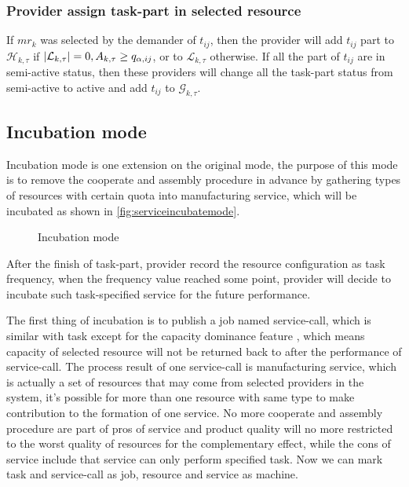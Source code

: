 \subsubsection{Provider assign task-part in selected resource} %
\label{subs:assign_in_select_resource}
If $mr_k$ was selected by the demander of $t_{ij}$, then the provider will add $t_{ij}$ part to $\mathcal{H}_{k,\tau}$ if $\left|\mathcal{L}_{k,\tau}\right|=0,A_{k,\tau}\ge q_{\alpha,ij}$, or to  $\mathcal{L}_{k,\tau}$ otherwise.
If all the part of $t_{ij}$ are in semi-active status, then these providers will change all the task-part status from semi-active to active and add $t_{ij}$ to $\mathcal{G}_{k,\tau}$.

\subsection{Incubation mode} %
\label{sub:incubation_mode}
Incubation mode is one extension on the original mode, the purpose of this mode is to remove the cooperate and assembly procedure in advance by gathering types of resources with certain quota into manufacturing service, which will be incubated as shown in \autoref{fig:serviceincubatemode}.  
\begin{figure}[htbp]
    \centering
    \resizebox{0.7\textwidth}{!}{}
    \caption{Incubation mode}
    \label{fig:serviceincubatemode}
\end{figure}
After the finish of task-part, provider record the resource configuration as task frequency, when the frequency value reached some point, provider will decide to incubate such task-specified service for the future performance.

The first thing of incubation is to publish a job named service-call, which is similar with task except for the capacity dominance feature , which means capacity of selected resource will not be returned back to after the performance of service-call. The process result of one service-call is manufacturing service, which is actually a set of resources that may come from selected providers in the system, it's possible for more than one resource with same type to make contribution to the formation of one service. No more cooperate and assembly procedure are part of pros of service and product quality will no more restricted to the worst quality of resources for the complementary effect, while the cons of service include that service can only perform specified task.
Now we can mark task and service-call as job, resource and service as machine.

